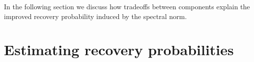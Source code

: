 \documentclass[12pt]{amsart}
\theoremstyle{remark}
\newtheorem{remark}[lemma]{Remark}
\DeclareMathOperator*{\argmin}{arg\,min}
\begin{document}




In the following section we discuss how tradeoffs between components explain the improved recovery probability induced by the spectral norm.

\section{Estimating recovery probabilities}
\end{document}
